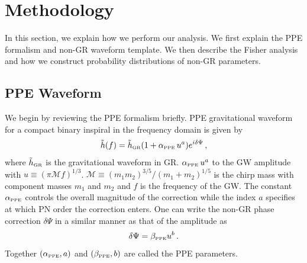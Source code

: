 \documentclass[prd,twocolumn,nofootinbib]{revtex4-1}
\newcommand{\PPE}{{\mbox{\tiny PPE}}}
\newcommand{\GR}{{\mbox{\tiny GR}}}
\begin{document}




\section{Methodology}\label{section:method}

In this section, we explain how we perform our analysis. We first explain the PPE formalism and non-GR waveform template. We then describe the Fisher analysis and how we construct probability distributions of non-GR parameters.

\subsection{PPE Waveform}\label{section:ppE}
We begin by reviewing the PPE formalism briefly. PPE gravitational waveform for a compact binary inspiral in the frequency domain is given by~\cite{Yunes:2009ke}
\begin{equation}\label{eq:2a}
\tilde{h}(f)=\tilde{h}_{\GR}(1+\alpha_{\PPE}\, u^a)e^{i\delta\Psi}\,,
\end{equation}
where $\tilde{h}_{\GR}$ is the gravitational waveform in GR. $\alpha_{\PPE}\, u^a$ to the GW amplitude with $u\equiv(\pi \mathcal{M} f)^{1/3}$.  $\mathcal{M}\equiv(m_1m_2)^{3/5}/(m_1+m_2)^{1/5}$ is the chirp mass with component masses $m_1$ and $m_2$ and $f$ is the frequency of the GW. The constant $\alpha_{\PPE}$ controls the overall magnitude of the correction while the index $a$ specifies at which PN order the correction enters. One can write the non-GR phase correction $\delta\Psi$ in a similar manner as that of the amplitude as
\begin{equation}\label{eq:2b}
\delta\Psi=\beta_{\PPE} u^b\,.
\end{equation}
Together $\left(\alpha_{\PPE},a\right)$ and $\left(\beta_{\PPE},b\right)$ are called the PPE parameters.
\end{document}
